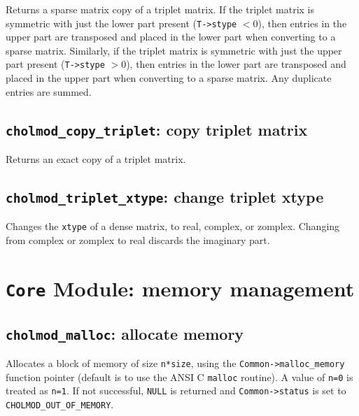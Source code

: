 \documentclass[11pt]{article}
\begin{document}

Returns a sparse matrix copy of a triplet matrix.
If the triplet matrix is symmetric with just the lower part present ({\tt T->stype} $< 0$),
then entries in the upper part are transposed and placed in the lower part when
converting to a sparse matrix.  Similarly,
if the triplet matrix is symmetric with just the upper part present ({\tt T->stype} $> 0$),
then entries in the lower part are transposed and placed in the upper part when
converting to a sparse matrix.
Any duplicate entries are summed.

\newpage \subsection{{\tt cholmod\_copy\_triplet}: copy triplet matrix}


Returns an exact copy of a triplet matrix.

\subsection{{\tt cholmod\_triplet\_xtype}: change triplet xtype}


Changes the {\tt xtype} of a dense matrix, to real, complex, or zomplex.
Changing from complex or zomplex to real discards the imaginary part.

\newpage \section{{\tt Core} Module: memory management}

\subsection{{\tt cholmod\_malloc}: allocate memory}


Allocates a block of memory of size {\tt n*size},
using the {\tt Common->malloc\_memory}
function pointer (default is to use the ANSI C {\tt malloc} routine).
A value of {\tt n=0} is treated as {\tt n=1}.
If not successful, {\tt NULL} is returned and {\tt Common->status} is set to {\tt CHOLMOD\_OUT\_OF\_MEMORY}.
\end{document}
